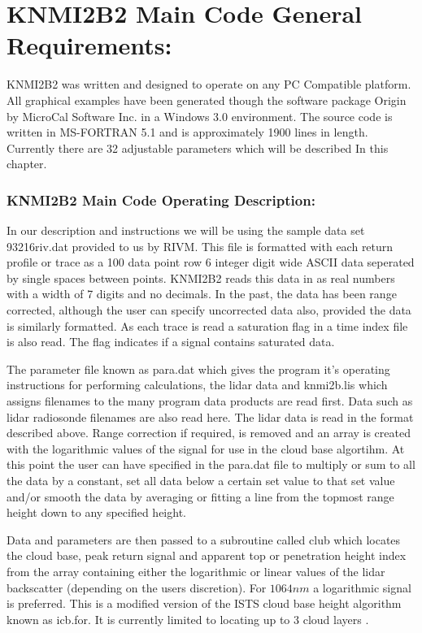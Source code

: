 \chapter{KNMI2B2 Main Code General Requirements:}

KNMI2B2 was written and designed to operate on any PC Compatible
platform. All graphical examples have been generated though
the software package Origin by MicroCal Software Inc. in a Windows 3.0
environment. The source code is written in MS-FORTRAN 5.1 and is 
approximately 1900 lines in length. Currently there are 32 adjustable
parameters which will be described In this chapter.

\subsection{KNMI2B2 Main Code Operating Description:}

In our description and instructions we will be using the sample data 
set 93216riv.dat provided to us by RIVM. This file is formatted with 
each return profile or trace as a 100 data point row 
6 integer digit wide ASCII data seperated by single spaces between points.
KNMI2B2 reads this data in as real numbers with a width of 7 digits and no
decimals. In the past, the data has been range corrected, although
the user can specify uncorrected data also, provided the data is
similarly formatted. As each trace is read a saturation flag in a
time index file is also read. The flag indicates if a signal contains 
saturated data.

The parameter file known as para.dat which gives the program it's
operating instructions for performing calculations, the lidar
data and knmi2b.lis which assigns filenames to the many program 
data products are read first. Data such as lidar radiosonde filenames
are also read here. The lidar data is read in the format
described above. Range correction if required, 
is removed and an array is created with the logarithmic 
values of the signal for use in the cloud base
algortihm. At this point the user can have specified in the para.dat
file to multiply or sum to all the data by a constant, set all data
below a certain set value to that set value and/or smooth the data
by averaging or fitting a line from the topmost range height 
down to any specified height.

Data and parameters are then passed to a subroutine
called club which locates the cloud base, peak return signal and
apparent top or penetration height index from the array containing
either the logarithmic or linear values of the lidar backscatter
(depending on the users discretion). For $1064 nm$ a logarithmic 
signal is preferred. This is a modified
version of the ISTS cloud base height algorithm known as icb.for.
It is currently limited to locating up to 3 cloud layers \cite{srpwsaic}.

